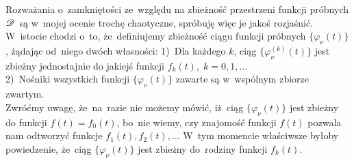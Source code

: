 \documentclass[a4paper,11pt]{article}
\begin{document}
\begin{center}
\end{center}

\vspace{\spaceTwo}


\noindent


\vspace{\spaceTwo}










\newpage





\start {} Rozważania o~zamkniętości ze~względu na zbieżność
przestrzeni funkcji próbnych $\mathcal{D}$~są w~mojej ocenie trochę
chaotyczne, spróbuję więc je jakoś rozjaśnić. W~istocie chodzi o~to,
że~definiujemy zbieżność ciągu funkcji próbnych
$\{ \varphi_{ \nu }( t ) \}$, żądając od~niego dwóch własności:
1)~Dla każdego $k$, ciąg $\{ \varphi_{ \nu }^{ ( k ) }( t ) \}$ jest
zbieżny jednostajnie do jakiejś funkcji
$f_{ k }( t ), \; k = 0, 1, \ldots$ \\
2)~Nośniki wszystkich funkcji $\{ \varphi_{ \nu }( t ) \}$ zawarte są
w~wspólnym zbiorze zwartym. \\
Zwróćmy uwagę, że~na~razie nie możemy mówić, iż~ciąg
$\{ \varphi_{ \nu }( t ) \}$ jest zbieżny do funkcji
$f( t ) = f_{ 0 }( t )$, bo~nie wiemy, czy znajomość funkcji $f( t )$
pozwala nam odtworzyć funkcje $f_{ 1 }( t ), f_{ 2 }( t ), \ldots$ W~tym
momencie właściwsze byłoby powiedzenie, że~ciąg
$\{ \varphi_{ \nu }( t ) \}$ jest zbieżny do~rodziny funkcji
$f_{ k }( t )$.
\end{document}
